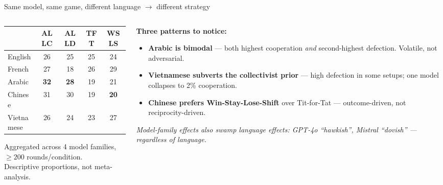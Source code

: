 \documentclass[11pt,aspectratio=169]{beamer}
\begin{document}
\begin{frame}{Same model, same game, different language $\rightarrow$ different strategy}
    \begin{columns}[T]
        \begin{column}{0.42\textwidth}
            \begin{table}
            \centering\small
            \begin{tabular}{@{}lcccc@{}}
                \toprule
                & ALLC & ALLD & TFT & WSLS \\
                \midrule
                English    & 26 & 25 & 25 & 24 \\
                French     & 27 & 18 & 26 & 29 \\
                Arabic     & \textbf{32} & \textbf{28} & 19 & 21 \\
                Chinese    & 31 & 30 & 19 & \textbf{20} \\
                Vietnamese & 26 & 24 & 23 & 27 \\
                \bottomrule
            \end{tabular}
            \end{table}
            \scriptsize Aggregated across 4 model families,\\$\geq 200$ rounds/condition.\\Descriptive proportions, not meta-analysis.
        \end{column}
        \begin{column}{0.55\textwidth}
            \textbf{Three patterns to notice:}
            \vspace{0.2cm}
            \begin{itemize}
                \setlength\itemsep{0.4em}
                \item \textcolor{rsclaret}{\textbf{Arabic is bimodal}} — both highest cooperation \emph{and} second-highest defection. Volatile, not adversarial.
                \item \textbf{Vietnamese subverts the collectivist prior} — high defection in some setups; one model collapses to 2\% cooperation.
                \item \textbf{Chinese prefers Win-Stay-Lose-Shift} over Tit-for-Tat — outcome-driven, not reciprocity-driven.
            \end{itemize}
            \vspace{0.2cm}
            \scriptsize\itshape Model-family effects also swamp language effects: GPT-4o ``hawkish'', Mistral ``dovish'' — regardless of language.
        \end{column}
    \end{columns}
\end{frame}
\end{document}
